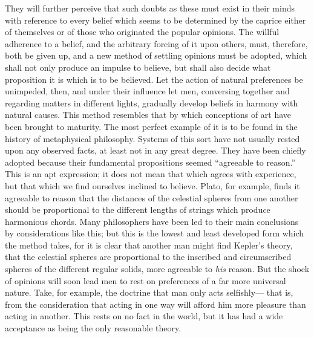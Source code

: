 They will further perceive that such doubts as these must exist in their minds with reference to every belief which seems to be determined by the caprice either of themselves or of those who originated the popular opinions. The willful adherence to a belief, and the arbitrary forcing of it upon others, must, therefore, both be given up, and a new method of settling opinions must be adopted, which shall not only produce an impulse to believe, but shall also decide what proposition it is which is to be believed. Let the action of natural preferences be unimpeded, then, and under their influence let men, conversing together and regarding matters in different lights, gradually develop beliefs in harmony with natural causes. This method resembles that by which conceptions of art have been brought to maturity. The most perfect example of it is to be found in the history of metaphysical philosophy. Systems of this sort have not usually rested upon any observed facts, at least not in any great degree. They have been chiefly adopted because their fundamental propositions seemed ``agreeable to reason.'' This is an apt expression; it does not mean that which agrees with experience, but that which we find ourselves inclined to believe. Plato, for example, finds it agreeable to reason that the distances of the celestial spheres from one another should be proportional to the different lengths of strings which produce harmonious chords. Many philosophers have been led to their main conclusions by considerations like this; but this is the lowest and least developed form which the method takes, for it is clear that another man might find Kepler's theory, that the celestial spheres are proportional to the inscribed and circumscribed spheres of the different regular solids, more agreeable to \emph{his} reason. But the shock of opinions will soon lead men to rest on preferences of a far more universal nature. Take, for example, the doctrine that man only acts selfishly--- that is, from the consideration that acting in one way will afford him more pleasure than acting in another. This rests on no fact in the world, but it has had a wide acceptance as being the only reasonable theory.


